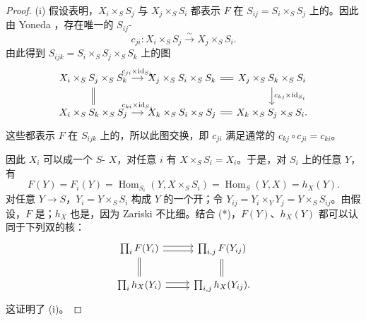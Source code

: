 \begin{proof}
(i) 假设表明，$X_i\times_SS_j$ 与 $X_j\times_SS_i$ 都表示 $F$ 在 $S_{ij}=S_i\times_SS_j$ 上的。因此由 Yoneda ，存在唯一的 $S_{ij}$-
\[
c_{ji}:X_i\times_SS_j\xrightarrow{\sim}X_j\times_SS_i.
\]
由此得到 $S_{ijk}=S_i\times_SS_j\times_SS_k$ 上的图
\[
\begin{tikzcd}[column sep=small]
X_i\times_SS_j\times_SS_k \arrow[r,"c_{ji}\times\mathrm{id}_{S_k}"] \arrow[d,equal] & X_j\times_SS_i\times_SS_k \arrow[r,equal] & X_j\times_SS_k\times_SS_i \arrow[d,"c_{kj}\times\mathrm{id}_{S_i}"]\\
X_i\times_SS_k\times_SS_j \arrow[r,"c_{ki}\times\mathrm{id}_{S_j}"] & X_k\times_SS_i\times_SS_j \arrow[r,equal] & X_k\times_SS_j\times_SS_i .
\end{tikzcd}
\]
这些都表示 $F$ 在 $S_{ijk}$ 上的，所以此图交换，即 $c_{ji}$ 满足通常的 $c_{kj}\circ c_{ji}=c_{ki}$。

因此 $X_i$ 可以成一个 $S$- $X$，对任意 $i$ 有 $X\times_SS_i=X_i$。于是，对 $S_i$ 上的任意 $Y$，有
\[
F(Y)=F_i(Y)=\operatorname{Hom}_{S_i}(Y,X\times_SS_i)=\operatorname{Hom}_S(Y,X)=h_X(Y).\tag{*}
\]
对任意 $Y\to S$，$Y_i=Y\times_SS_i$ 构成 $Y$ 的一个开；令 $Y_{ij}=Y_i\times_YY_j=Y\times_SS_{ij}$。由假设，$F$ 是；$h_X$ 也是，因为 Zariski 不比细。结合 (*)，$F(Y)$、$h_X(Y)$ 都可以认同于下列双的核：
\[
\begin{tikzcd}
\prod_iF(Y_i) \arrow[r,shift left] \arrow[r,shift right] & \prod_{i,j}F(Y_{ij})\\
\prod_ih_X(Y_i) \arrow[r,shift left] \arrow[r,shift right] \arrow[u,equal] & \prod_{i,j}h_X(Y_{ij}) \arrow[u,equal].
\end{tikzcd}
\]
这证明了 (i)。


\end{proof}
